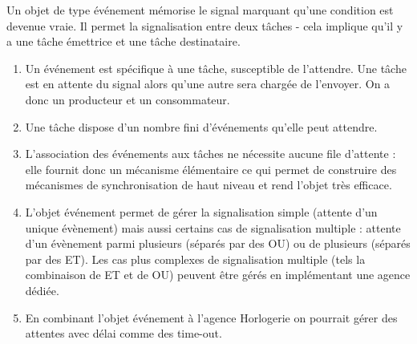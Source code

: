 {
Un objet de type événement mémorise le signal marquant qu'une condition 
est devenue vraie. Il permet la signalisation entre deux tâches - cela 
implique qu'il y a une tâche émettrice et une tâche destinataire. 
}
{
\begin{enumerate}
   \item Un événement est spécifique à une tâche, susceptible de l'attendre.
   Une tâche est en attente du signal alors qu'une autre sera chargée de l'envoyer. 
   On a donc un producteur et un consommateur.
   \item Une tâche dispose d'un nombre fini d'événements qu'elle peut
   attendre.
   \item L'association des événements aux tâches ne nécessite aucune file
   d'attente : elle fournit donc un mécanisme élémentaire ce qui permet de 
   construire des mécanismes de synchronisation de haut niveau et rend l'objet très efficace.
   \item L'objet événement permet de gérer la signalisation simple (attente
   d'un unique évènement) mais aussi certains cas de signalisation multiple : attente d'un évènement 
   parmi plusieurs (séparés par des OU) ou de plusieurs (séparés par des ET). 
   Les cas plus complexes de signalisation multiple (tels la combinaison de ET
   et de OU) peuvent être gérés en implémentant une agence dédiée.
   \item En combinant l'objet événement à l'agence Horlogerie on pourrait
   gérer des attentes avec délai comme des time-out.
\end{enumerate}
}
